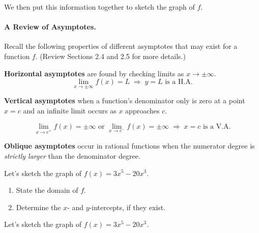 \documentclass[12pt]{article}
\begin{document}
We then put this information together to sketch the graph of $f$.

\newpage

\paragraph{A Review of Asymptotes.} Recall the following properties of different asymptotes that may exist for a function $f$. (Review Sections 2.4 and 2.5 for more details.)

\vspace{5mm}


\textbf{Horizontal asymptotes} are found by checking limits as $x\to\pm\infty$.
$$\displaystyle\lim_{x\to\pm\infty}f(x)=L\;\Rightarrow\; y=L \text{ is a H.A.}$$

\vspace{3mm}

\textbf{Vertical asymptotes} when a function's denominator only is zero at a point $x=c$ and an infinite limit occurs as $x$ approaches $c$.

$$\displaystyle\lim_{x\to c^+}f(x)=\pm\infty \text{ or } \displaystyle\lim_{x\to c^-}f(x)=\pm\infty \; \Rightarrow \; x=c\text{ is a V.A.}$$

\vspace{3mm}

\textbf{Oblique asymptotes} occur in rational functions when the numerator degree is \textit{strictly larger} than the denominator degree.

\vspace{5mm}

\Example Let's sketch the graph of $f(x)=3x^5-20x^3$.

\begin{enumerate}
\item[\tc{1}] State the domain of $f$.

\vspace{40mm}

\item[\tc{2}] Determine the $x$- and $y$-intercepts, if they exist.

\end{enumerate}

\newpage

\ExampleCont Let's sketch the graph of $f(x)=3x^5-20x^3$.
\end{document}
